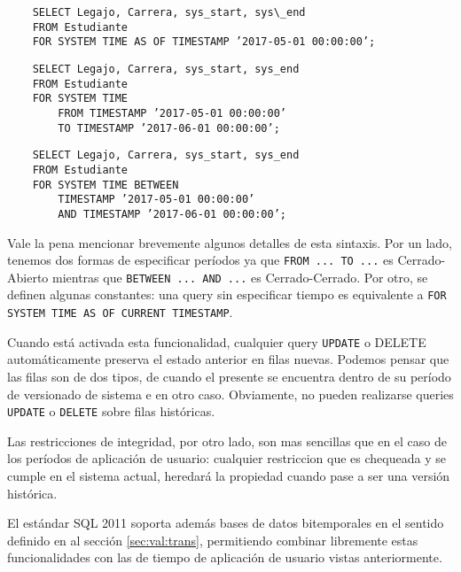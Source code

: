 \begin{verbatim}
    SELECT Legajo, Carrera, sys_start, sys\_end
    FROM Estudiante
    FOR SYSTEM TIME AS OF TIMESTAMP ’2017-05-01 00:00:00’;
\end{verbatim}

\begin{verbatim}
    SELECT Legajo, Carrera, sys_start, sys_end
    FROM Estudiante
    FOR SYSTEM TIME
        FROM TIMESTAMP ’2017-05-01 00:00:00’
        TO TIMESTAMP ’2017-06-01 00:00:00’;
\end{verbatim}


\begin{verbatim}
    SELECT Legajo, Carrera, sys_start, sys_end
    FROM Estudiante
    FOR SYSTEM TIME BETWEEN
        TIMESTAMP ’2017-05-01 00:00:00’
        AND TIMESTAMP ’2017-06-01 00:00:00’;
\end{verbatim}

Vale la pena mencionar brevemente algunos detalles de esta sintaxis.
Por un lado, tenemos dos formas de especificar períodos ya que \texttt{FROM ... TO ...} es Cerrado-Abierto
mientras que \texttt{BETWEEN ... AND ...} es Cerrado-Cerrado.
Por otro, se definen algunas constantes:
una query sin especificar tiempo es equivalente a \texttt{FOR SYSTEM TIME AS OF CURRENT TIMESTAMP}.

Cuando está activada esta funcionalidad, cualquier query \texttt{UPDATE} o DELETE automáticamente preserva el estado anterior en filas nuevas.
Podemos pensar que las filas son de dos tipos,
de  cuando el presente se encuentra dentro de su período de versionado de sistema
e  en otro caso.
Obviamente, no pueden realizarse queries \texttt{UPDATE} o \texttt{DELETE} sobre filas históricas.

Las restricciones de integridad, por otro lado, son mas sencillas que en el caso de los períodos de aplicación de usuario:
cualquier restriccion que es chequeada y se cumple en el sistema actual, heredará la propiedad cuando pase a ser una versión histórica.

El estándar SQL 2011 soporta además bases de datos bitemporales en el sentido definido en al sección \ref{sec:val:trans},
permitiendo combinar libremente estas funcionalidades con las de tiempo de aplicación de usuario vistas anteriormente.